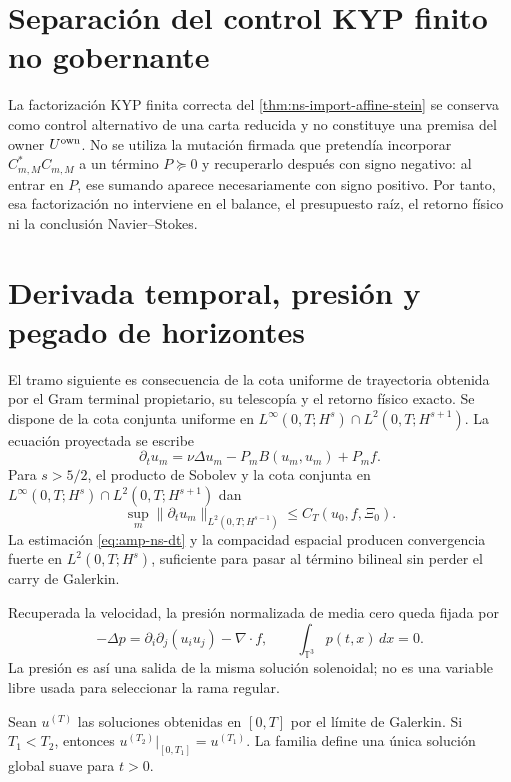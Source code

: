 \section*{Separación del control KYP finito no gobernante}

La factorización KYP finita correcta del
\cref{thm:ns-import-affine-stein} se conserva como control alternativo de
una carta reducida y no constituye una premisa del owner
\(U^{\rm own}\). No se utiliza la mutación firmada que pretendía
incorporar \(C_{m,M}^*C_{m,M}\) a un término \(P\succeq0\) y
recuperarlo después con signo negativo: al entrar en \(P\), ese
sumando aparece necesariamente con signo positivo. Por tanto, esa
factorización no interviene en el balance, el presupuesto raíz, el retorno
físico ni la conclusión Navier--Stokes.

\section*{Derivada temporal, presión y pegado de horizontes}

El tramo siguiente es consecuencia de la cota uniforme de trayectoria
obtenida por el Gram terminal propietario, su telescopía y el retorno
físico exacto. Se
dispone de la cota conjunta uniforme en
\(L^\infty(0,T;H^s)\cap L^2(0,T;H^{s+1})\).
La ecuación proyectada se escribe
\begin{equation}\label{eq:amp-ns-proyectada}
 \partial_tu_m
 =\nu\Delta u_m-P_mB(u_m,u_m)+P_mf.
\end{equation}
Para \(s>5/2\), el producto de Sobolev y la cota conjunta en
\(L^\infty(0,T;H^s)\cap L^2(0,T;H^{s+1})\) dan
\begin{equation}\label{eq:amp-ns-dt}
 \sup_m\|\partial_tu_m\|_{L^2(0,T;H^{s-1})}
 \leq C_T(u_0,f,\Xi_0).
\end{equation}
La estimación \eqref{eq:amp-ns-dt} y la compacidad espacial producen
convergencia fuerte en \(L^2(0,T;H^s)\), suficiente para pasar al término
bilineal sin perder el carry de Galerkin.

Recuperada la velocidad, la presión normalizada de media cero queda fijada
por
\begin{equation}\label{eq:amp-ns-presion}
 -\Delta p
 =\partial_i\partial_j(u_i u_j)-\nabla\!\cdot f,
 \qquad \int_{\mathbb T^3}p(t,x)\,dx=0.
\end{equation}
La presión es así una salida de la misma solución solenoidal; no es una
variable libre usada para seleccionar la rama regular.

\begin{proposition}
\label{prop:amp-ns-pegado}
Sean \(u^{(T)}\) las soluciones obtenidas en \([0,T]\) por el límite de
Galerkin. Si \(T_1<T_2\), entonces
\(u^{(T_2)}|_{[0,T_1]}=u^{(T_1)}\). La familia define una única solución
global suave para \(t>0\).
\end{proposition}


